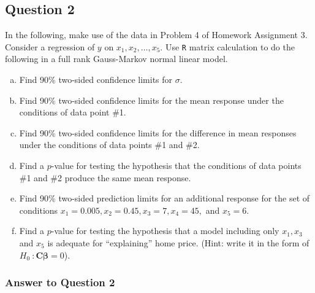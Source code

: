 \documentclass[paper=a4, fontsize=11pt]{scrartcl} %
\newcommand{\vecBeta}{\mathbf{\beta}}
\newcommand{\matC}{\mathbf{C}}
\begin{document}
\subsection*{Question 2}
In the following, make use of the data in Problem 4 of Homework Assignment 3. 
Consider a regression of $y$ on $x_1, x_2, \ldots, x_5$. Use \texttt{R} matrix 
calculation to do the following in a full rank Gauss-Markov normal linear model.\\



\begin{enumerate}[(a)]

\item Find 90\% two-sided confidence limits for $\sigma$.\\

\item Find 90\% two-sided confidence limits for the mean response under the conditions of data point \#1.\\

\item Find 90\% two-sided confidence limits for the difference in mean responses under the conditions
of data points \#1 and \#2.\\

\item Find a $p$-value for testing the hypothesis that the conditions of data points \#1 and \#2 produce
the same mean response.\\

\item Find 90\% two-sided prediction limits for an additional response for the set of conditions
$x_1 = 0.005, x_2 = 0.45, x_3 =7, x_4 = 45,$ and $x_5 = 6.$\\

\item Find a $p$-value for testing the hypothesis that a model including only $ x_1, x_3$ and $x_5$ is 
adequate for ``explaining'' home price. (Hint: write it in the form of $ H_0 \ : \matC \vecBeta = 0$).\\
\end{enumerate}
\bigskip
\subsubsection*{Answer to Question 2}
\end{document}
